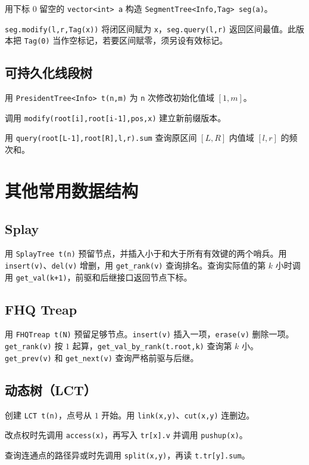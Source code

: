 用下标 $0$ 留空的 \texttt{vector<int> a} 构造 \texttt{SegmentTree<Info,Tag> seg(a)}。

\texttt{seg.modify(l,r,Tag(x))} 将闭区间赋为 \texttt{x}，\texttt{seg.query(l,r)} 返回区间最值。此版本把 \texttt{Tag(0)} 当作空标记，若要区间赋零，须另设有效标记。


\subsection{可持久化线段树}

用 \texttt{PresidentTree<Info> t(n,m)} 为 \texttt{n} 次修改初始化值域 $[1,m]$。

调用 \texttt{modify(root[i],root[i-1],pos,x)} 建立新前缀版本。

用 \texttt{query(root[L-1],root[R],l,r).sum} 查询原区间 $[L,R]$ 内值域 $[l,r]$ 的频次和。


\section{其他常用数据结构}

\subsection{Splay}

用 \texttt{SplayTree t(n)} 预留节点，并插入小于和大于所有有效键的两个哨兵。用 \texttt{insert(v)}、\texttt{del(v)} 增删，用 \texttt{get\_rank(v)} 查询排名。查询实际值的第 $k$ 小时调用 \texttt{get\_val(k+1)}，前驱和后继接口返回节点下标。


\subsection{FHQ Treap}

用 \texttt{FHQTreap t(N)} 预留足够节点。\texttt{insert(v)} 插入一项，\texttt{erase(v)} 删除一项。\texttt{get\_rank(v)} 按 $1$ 起算，\texttt{get\_val\_by\_rank(t.root,k)} 查询第 $k$ 小。\texttt{get\_prev(v)} 和 \texttt{get\_next(v)} 查询严格前驱与后继。


\subsection{动态树（LCT）}

创建 \texttt{LCT t(n)}，点号从 $1$ 开始。用 \texttt{link(x,y)}、\texttt{cut(x,y)} 连删边。

改点权时先调用 \texttt{access(x)}，再写入 \texttt{tr[x].v} 并调用 \texttt{pushup(x)}。

查询连通点的路径异或时先调用 \texttt{split(x,y)}，再读 \texttt{t.tr[y].sum}。

